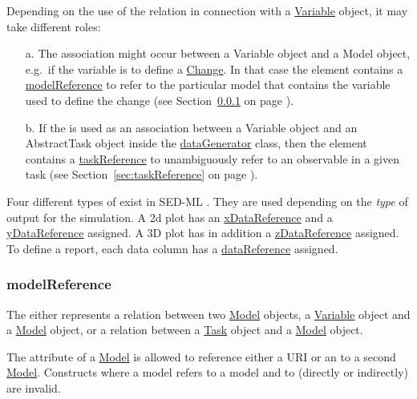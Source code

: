 Depending on the use of the  relation in connection with a \hyperref[class:variable]{Variable} object, it may take different roles: 

\begin{enumerate}
\item[a.]{The  association might occur between a Variable object and a Model object, e.g.\ if the variable is to define a \hyperref[class:change]{Change}. 
In that case the  element contains a \hyperref[sec:modelReference]{modelReference} to refer to the particular model that contains the variable used to define the change (see Section~\ref{sec:modelReference} on page \pageref{sec:modelReference}). }
\item[b.]{If the  is used as an association between a Variable object and an AbstractTask object inside the \hyperref[class:dataGenerator]{dataGenerator} class, then the  element contains a \hyperref[sec:taskReference]{taskReference} to unambiguously refer to an observable in a given task (see Section~\ref{sec:taskReference} on page \pageref{sec:taskReference}).}
\end{enumerate}

Four different types of  exist in SED-ML \currentLV. They are used depending on the \emph{type} of output for the simulation. A 2d plot has an \hyperref[sec:xDataReference]{xDataReference} and a \hyperref[sec:yDataReference]{yDataReference} assigned. A 3D plot has in addition a \hyperref[sec:zDataReference]{zDataReference} assigned. To define a report, each data column has a \hyperref[sec:dataReference1]{dataReference} assigned.


\subsubsection{modelReference}
\label{sec:modelReference}
%
The  either represents a relation between two \hyperref[class:model]{Model} objects, a \hyperref[class:variable]{Variable} object and a \hyperref[class:model]{Model} object, or  a relation between a \hyperref[class:task]{Task} object and a \hyperref[class:model]{Model} object.

The  attribute of a \hyperref[class:model]{Model} is allowed to reference either a URI or an  to a second \hyperref[class:model]{Model}. Constructs where a model  refers to a model  and  to  (directly or indirectly) are invalid.

